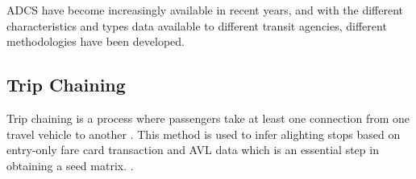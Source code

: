 \documentclass[11pt,twoside]{article}
\numberwithin{equation}{section}
\newcommand{\?}{\stackrel{?}{=}}
\begin{document}

ADCS have become increasingly available in recent years, and with the different characteristics and types data available to different transit agencies, different methodologies have been developed.



\subsection{Trip Chaining}
Trip chaining is a process where passengers take at least one connection from one travel vehicle to another \citep{huangMethodBusOD2020}. This method is used to infer alighting stops based on entry-only fare card transaction and AVL data which is an essential step in obtaining a seed matrix.  \citep{cuiBusPassengerOriginDestination2006}. 
\end{document}
